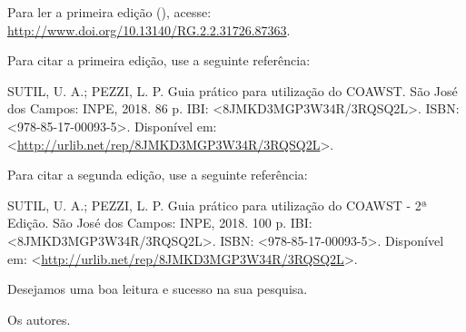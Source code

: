 \noindent Para ler a primeira edição (\cite{Sutil2018}), acesse: \textcolor{bleu_cite}{\href{http://www.doi.org/10.13140/RG.2.2.31726.87363}{http://www.doi.org/10.13140/RG.2.2.31726.87363}}.
\bigskip

\noindent Para citar a primeira edição, use a seguinte referência:
\bigskip

\noindent SUTIL, U. A.; PEZZI, L. P. Guia prático para utilização do COAWST. São José dos Campos: INPE, 2018. 86 p. IBI: <8JMKD3MGP3W34R/3RQSQ2L>. ISBN: <978-85-17-00093-5>. Disponível em: <\textcolor{bleu_cite}{\href{http://urlib.net/rep/8JMKD3MGP3W34R/3RQSQ2L}{http://urlib.net/rep/8JMKD3MGP3W34R/3RQSQ2L}}>. 
\bigskip

\noindent Para citar a segunda edição, use a seguinte referência:
\bigskip

\noindent SUTIL, U. A.; PEZZI, L. P. Guia prático para utilização do COAWST - 2ª Edição. São José dos Campos: INPE, 2018. 100 p. IBI: <8JMKD3MGP3W34R/3RQSQ2L>. ISBN: <978-85-17-00093-5>. Disponível em: <\textcolor{bleu_cite}{\href{http://urlib.net/rep/8JMKD3MGP3W34R/3RQSQ2L}{http://urlib.net/rep/8JMKD3MGP3W34R/3RQSQ2L}}>. 

\bigskip
\bigskip

\noindent Desejamos uma boa leitura e sucesso na sua pesquisa.
\begin{flushright}
\noindent Os autores.
\end{flushright}
\bigskip
